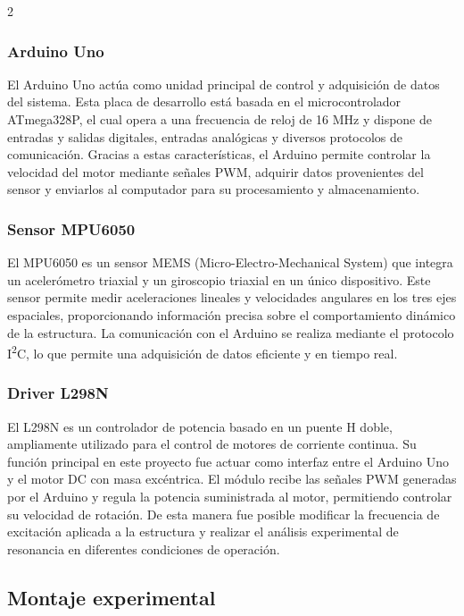 \documentclass[10pt]{article}
\begin{document}
\begin{multicols}{2}
\subsubsection{Arduino Uno}

El Arduino Uno actúa como unidad principal de control y adquisición de datos del sistema. Esta placa de desarrollo está basada en el microcontrolador ATmega328P, el cual opera a una frecuencia de reloj de 16 MHz y dispone de entradas y salidas digitales, entradas analógicas y diversos protocolos de comunicación. Gracias a estas características, el Arduino permite controlar la velocidad del motor mediante señales PWM, adquirir datos provenientes del sensor y enviarlos al computador para su procesamiento y almacenamiento.

\subsubsection{Sensor MPU6050}

El MPU6050 es un sensor MEMS (Micro-Electro-Mechanical System) que integra un acelerómetro triaxial y un giroscopio triaxial en un único dispositivo. Este sensor permite medir aceleraciones lineales y velocidades angulares en los tres ejes espaciales, proporcionando información precisa sobre el comportamiento dinámico de la estructura. La comunicación con el Arduino se realiza mediante el protocolo I\textsuperscript{2}C, lo que permite una adquisición de datos eficiente y en tiempo real.

\subsubsection{Driver L298N}

El L298N es un controlador de potencia basado en un puente H doble, ampliamente utilizado para el control de motores de corriente continua. Su función principal en este proyecto fue actuar como interfaz entre el Arduino Uno y el motor DC con masa excéntrica. El módulo recibe las señales PWM generadas por el Arduino y regula la potencia suministrada al motor, permitiendo controlar su velocidad de rotación. De esta manera fue posible modificar la frecuencia de excitación aplicada a la estructura y realizar el análisis experimental de resonancia en diferentes condiciones de operación.

\subsection{Montaje experimental}


\end{multicols}
\end{document}
